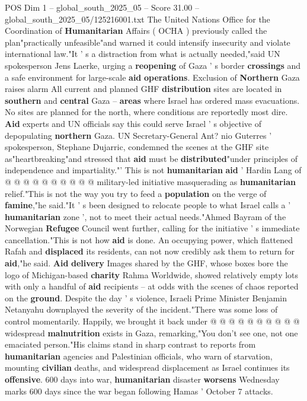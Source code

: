 \begin{textsample}{POS Dim 1 – global\_south\_2025\_05 – Score 31.00 – global\_south\_2025\_05/125216001.txt}
The United Nations Office for the Coordination of \textbf{Humanitarian} Affairs ( OCHA ) previously called the plan"practically unfeasible"and warned it could intensify insecurity and violate international law."It ' s a distraction from what is actually needed,"said UN spokesperson Jens Laerke, urging a \textbf{reopening} of Gaza ' s border \textbf{crossings} and a safe environment for large-scale \textbf{aid} \textbf{operations}.
Exclusion of \textbf{Northern} Gaza raises alarm All current and planned GHF \textbf{distribution} sites are located in \textbf{southern} and \textbf{central} Gaza -- \textbf{areas} where Israel has ordered mass evacuations.
No sites are planned for the north, where conditions are reportedly most dire. \textbf{Aid} experts and UN officials say this could serve Israel ' s objective of depopulating \textbf{northern} Gaza.
UN Secretary-General Ant? nio Guterres ' spokesperson, Stephane Dujarric, condemned the scenes at the GHF site as"heartbreaking"and stressed that \textbf{aid} must be \textbf{distributed}"under principles of independence and impartiality."' This is not \textbf{humanitarian} \textbf{aid} ' Hardin Lang of @ @ @ @ @ @ @ @ @ @ military-led initiative masquerading as \textbf{humanitarian} relief."This is not the way you try to feed a \textbf{population} on the verge of \textbf{famine},"he said."It ' s been designed to relocate people to what Israel calls a ' \textbf{humanitarian} zone ', not to meet their actual needs."Ahmed Bayram of the Norwegian \textbf{Refugee} Council went further, calling for the initiative ' s immediate cancellation."This is not how \textbf{aid} is done.
An occupying power, which flattened Rafah and \textbf{displaced} its residents, can not now credibly ask them to return for \textbf{aid},"he said. \textbf{Aid} \textbf{delivery} Images shared by the GHF, whose boxes bore the logo of Michigan-based \textbf{charity} Rahma Worldwide, showed relatively empty lots with only a handful of \textbf{aid} recipients -- at odds with the scenes of chaos reported on the \textbf{ground}.
Despite the day ' s violence, Israeli Prime Minister Benjamin Netanyahu downplayed the severity of the incident."There was some loss of control momentarily.
Happily, we brought it back under @ @ @ @ @ @ @ @ @ @ widespread \textbf{malnutrition} exists in Gaza, remarking,"You don't see one, not one emaciated person."His claims stand in sharp contrast to reports from \textbf{humanitarian} agencies and Palestinian officials, who warn of starvation, mounting \textbf{civilian} deaths, and widespread displacement as Israel continues its \textbf{offensive}. 600 days into war, \textbf{humanitarian} disaster \textbf{worsens} Wednesday marks 600 days since the war began following Hamas ' October 7 attacks.

\end{textsample}
